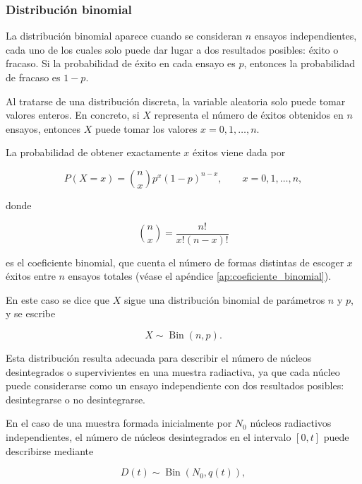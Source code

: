 \documentclass[12pt,a4paper]{article}
\newcommand{\refmargen}[2]{%
  \marginnote{%
    \makebox[\marginparwidth][l]{%
      \parbox[t]{1.7cm}{%
        \scriptsize\raggedright\textbf{#1}\\[-0.2em] #2%
      }%
    }%
  }%
}
\begin{document}
\subsubsection{Distribución binomial}

La distribución binomial aparece cuando se consideran $n$ ensayos independientes, cada uno de los cuales solo puede dar lugar a dos resultados posibles: éxito o fracaso. Si la probabilidad de éxito en cada ensayo es $p$, entonces la probabilidad de fracaso es $1-p$.

Al tratarse de una distribución discreta, la variable aleatoria solo puede tomar valores enteros. En concreto, si $X$ representa el número de éxitos obtenidos en $n$ ensayos, entonces $X$ puede tomar los valores $x=0,1,\ldots,n$.

La probabilidad de obtener exactamente $x$ éxitos viene dada por \refmargen{Bevington \cite{bevington}}{cap.~2.1}

\begin{equation}
    P(X=x)=\binom{n}{x}p^x(1-p)^{n-x},
    \qquad x=0,1,\ldots,n,
    \label{eq:distribucionbinomial}
\end{equation}

donde

\begin{equation}
    \binom{n}{x}
    =
    \frac{n!}{x!(n-x)!}
    \label{eq:coeficiente_binomial}
\end{equation}

es el coeficiente binomial, que cuenta el número de formas distintas de escoger $x$ éxitos entre $n$ ensayos totales (véase el apéndice \ref{ap:coeficiente_binomial}).

En este caso se dice que $X$ sigue una distribución binomial de parámetros $n$ y $p$, y se escribe

\begin{equation}
    X\sim \operatorname{Bin}(n,p).
\end{equation}

Esta distribución resulta adecuada para describir el número de núcleos desintegrados o supervivientes en una muestra radiactiva, ya que cada núcleo puede considerarse como un ensayo independiente con dos resultados posibles: desintegrarse o no desintegrarse.

En el caso de una muestra formada inicialmente por $N_0$ núcleos radiactivos independientes, el número de núcleos desintegrados en el intervalo $[0,t]$ puede describirse mediante

\begin{equation}
    D(t)\sim \operatorname{Bin}(N_0,q(t)),
    \label{eq:desintegrados_binomial}
\end{equation}
\end{document}
